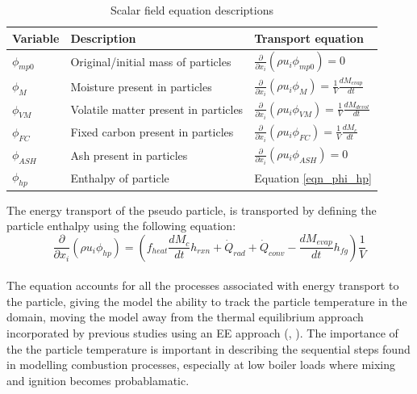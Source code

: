 \documentclass{webofc}
\begin{document}
\begin{table}[h!]
\centering
\caption{Scalar field equation descriptions}\label{tab_scalars}       
\begin{tabular}{lll}
\hline
Variable &Description& Transport equation \\
\hline
$\phi_{mp0}$ &Original/initial mass of particles& $\frac{\partial}{\partial x_{i}}(\rho u_{i} \phi_{mp0})=0$\\
$\phi_{M}$&Moisture present in particles&$\frac{\partial}{\partial x_{i}}(\rho u_{i} \phi_{M})=\frac{1}{V} \frac{dM_{evap}}{dt}$\\
$\phi_{VM}$&Volatile matter present in particles&  $\frac{\partial}{\partial x_{i}}(\rho u_{i} \phi_{VM})=\frac{1}{V}\frac{dM_{devol}}{dt}$\\
$\phi_{FC}$&Fixed carbon present in particles&$\frac{\partial}{\partial x_{i}}(\rho u_{i} \phi_{FC})=\frac{1}{V}\frac{dM_c}{dt}$\\
$\phi_{ASH}$&Ash present in particles&$\frac{\partial}{\partial x_{i}}(\rho u_{i} \phi_{ASH})=0$\\
$\phi_{hp}$&Enthalpy of particle&Equation \ref{eqn_phi_hp}\\
\hline
\end{tabular}
\end{table}

The energy transport of the pseudo particle, is transported by defining the particle enthalpy using the following equation:
\begin{equation}\label{eqn_phi_hp}
\frac{\partial}{\partial x_{i}}(\rho u_{i} \phi_{hp})=\left(f_{heat}\frac{dM_{c}}{dt}h_{rxn} + \dot{Q}_{rad} + \dot{Q}_{conv} - \frac{dM_{evap}}{dt}h_{fg}\right)\frac{1}{V}
\end{equation}
\\
The equation accounts for all the processes associated with energy transport to the particle, giving the model the ability to track the particle temperature in the domain, moving the model away from the thermal equilibrium approach incorporated by previous studies using an EE approach (\cite{epple}, \cite{knaus}). The importance of the the particle temperature is important in describing the sequential steps found in modelling combustion processes, especially at low boiler loads where mixing and ignition becomes probablamatic.
\end{document}

